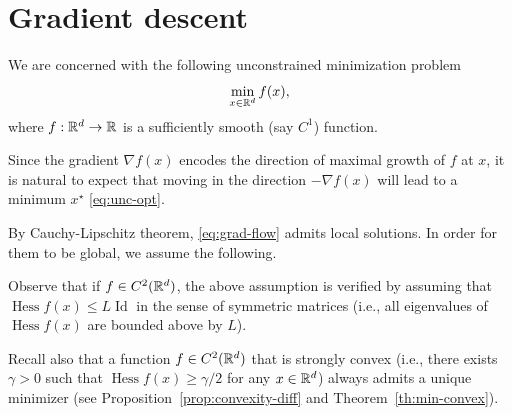 \documentclass{report}
\begin{document}
\section{Gradient descent}

We are concerned with the following unconstrained minimization problem 
\begin{equation}
	\label{eq:unc-opt}
	\min_{x\in\mathbb{R}^d} f(x),
\end{equation}
where $f:\mathbb{R}^d\to \mathbb{R}$ is a sufficiently smooth (say $C^1$) function.

Since the gradient $\nabla f(x)$ encodes the direction of maximal growth of $f$ at $x$, it is natural to expect that moving in the direction $-\nabla f(x)$ will lead to a minimum $x^\star$ \eqref{eq:unc-opt}. 


By Cauchy-Lipschitz theorem, \eqref{eq:grad-flow} admits local solutions. 
In order for them to be global, we assume the following.


Observe that if $f\in C^2(\mathbb{R}^d)$, the above assumption is verified by assuming that $\operatorname{Hess} f(x)\le L \operatorname{Id}$ in the sense of symmetric matrices (i.e.,  all eigenvalues of $\operatorname{Hess}f(x)$ are bounded above by $L$).

Recall also that a function $f\in C^2(\mathbb{R}^d)$ that is strongly convex (i.e., there exists $\gamma>0$ such that $\operatorname{Hess}f(x)\ge \gamma/2$ for any $x\in \mathbb{R}^d$) always admits a unique minimizer (see Proposition~\ref{prop:convexity-diff} and Theorem~\ref{th:min-convex}).

\end{document}
